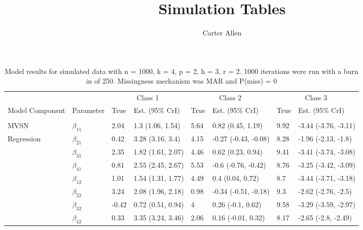 \documentclass[]{article}
\title{Simulation Tables}
\author{Carter Allen}
\date{}
\begin{document}
\maketitle

\begin{table}[t]

\caption{\label{tab:unnamed-chunk-5}Model results for simulated data with n = 1000, k = 4, p = 2, h = 3, r = 2. 1000 iterations were run with a burn in of 250. Missingness mechanism was MAR and P(miss) = 0}
\centering
\fontsize{8}{10}\selectfont
\begin{tabular}{llllllll}
\toprule
\multicolumn{2}{c}{ } & \multicolumn{2}{c}{Class 1} & \multicolumn{2}{c}{Class 2} & \multicolumn{2}{c}{Class 3} \\
\cmidrule(l{3pt}r{3pt}){3-4} \cmidrule(l{3pt}r{3pt}){5-6} \cmidrule(l{3pt}r{3pt}){7-8}
Model Component & Parameter & True & Est. (95\% CrI) & True & Est. (95\% CrI) & True & Est. (95\% CrI)\\
\midrule
\addlinespace[0.3em]
\multicolumn{8}{l}{\textbf{ }}\\
\hspace{1em}MVSN & $\beta_{11}$ & 2.04 & 1.3 (1.06, 1.54) & 5.64 & 0.82 (0.45, 1.19) & 9.92 & -3.44 (-3.76, -3.11)\\
\hspace{1em}Regression & $\beta_{21}$ & 0.42 & 3.28 (3.16, 3.4) & 4.15 & -0.27 (-0.43, -0.08) & 8.28 & -1.96 (-2.13, -1.8)\\
\hspace{1em} & $\beta_{31}$ & 2.35 & 1.82 (1.61, 2.07) & 4.46 & 0.62 (0.23, 0.94) & 9.41 & -3.41 (-3.74, -3.08)\\
\hspace{1em} & $\beta_{41}$ & 0.81 & 2.55 (2.45, 2.67) & 5.53 & -0.6 (-0.76, -0.42) & 8.76 & -3.25 (-3.42, -3.09)\\
\hspace{1em} & $\beta_{12}$ & 1.01 & 1.54 (1.31, 1.77) & 4.49 & 0.4 (0.04, 0.72) & 8.7 & -3.44 (-3.71, -3.18)\\
\hspace{1em} & $\beta_{22}$ & 3.24 & 2.08 (1.96, 2.18) & 0.98 & -0.34 (-0.51, -0.18) & 9.3 & -2.62 (-2.76, -2.5)\\
\hspace{1em} & $\beta_{32}$ & -0.42 & 0.72 (0.51, 0.94) & 4 & 0.26 (-0.1, 0.62) & 9.58 & -3.29 (-3.59, -2.97)\\
\hspace{1em} & $\beta_{42}$ & 0.33 & 3.35 (3.24, 3.46) & 2.06 & 0.16 (-0.01, 0.32) & 8.17 & -2.65 (-2.8, -2.49)\\

\end{tabular}
\end{table}
\end{document}
